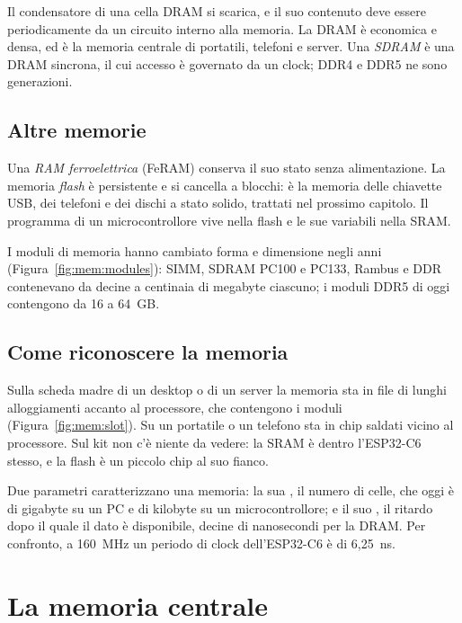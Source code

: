 Il condensatore di una cella DRAM si scarica, e il suo contenuto deve essere
 periodicamente da un circuito interno alla memoria. La DRAM
è economica e densa, ed è la memoria centrale di portatili, telefoni e server.
Una \emph{SDRAM} è una DRAM sincrona, il cui accesso è governato da un clock;
DDR4 e DDR5 ne sono generazioni.

\subsection{Altre memorie}

Una \emph{RAM ferroelettrica} (FeRAM) conserva il suo stato senza
alimentazione. La memoria \emph{flash} è persistente e si cancella a blocchi: è
la memoria delle chiavette USB, dei telefoni e dei dischi a stato solido,
trattati nel prossimo capitolo. Il programma di un microcontrollore vive nella
flash e le sue variabili nella SRAM.

I moduli di memoria hanno cambiato forma e dimensione negli anni
(Figura~\ref{fig:mem:modules}): SIMM, SDRAM PC100 e PC133, Rambus e DDR
contenevano da decine a centinaia di megabyte ciascuno; i moduli DDR5 di oggi
contengono da 16 a 64~GB.

\subsection{Come riconoscere la memoria}

Sulla scheda madre di un desktop o di un server la memoria sta in file di
lunghi alloggiamenti accanto al processore, che contengono i moduli
(Figura~\ref{fig:mem:slot}). Su un portatile o un telefono sta in chip saldati
vicino al processore. Sul kit \prg non c'è niente da vedere: la SRAM è dentro
l'ESP32-C6 stesso, e la flash è un piccolo chip al suo fianco.

Due parametri caratterizzano una memoria: la sua , il numero
di celle, che oggi è di gigabyte su un PC e di kilobyte su un microcontrollore;
e il suo , il ritardo dopo il quale il dato è
disponibile, decine di nanosecondi per la DRAM. Per confronto, a 160~MHz un
periodo di clock dell'ESP32-C6 è di 6,25~ns.

\section{La memoria centrale}

